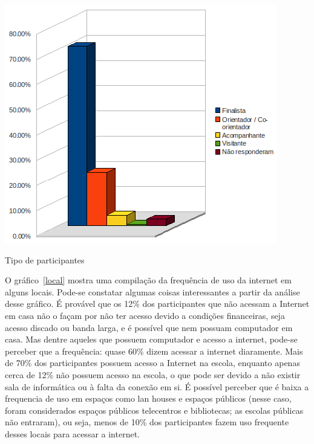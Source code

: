   \begin{grafico}
      \begin{center}
	\includegraphics[width=0.7\linewidth]{arquivos/participante.png}
      \end{center}
      \caption{Tipo de participantes}
      \label{participante}
  \end{grafico}

  O gráfico~\ref{local} mostra uma compilação da frequência de uso da internet em alguns locais. Pode-se constatar algumas coisas interessantes a partir 
da análise desse gráfico. É provável que os 12\% dos participantes que não acessam a Internet em casa não o façam por não ter acesso devido a 
condições financeiras, seja acesso discado ou banda larga, e é possível que nem possuam computador em casa. Mas dentre aqueles que possuem computador 
e acesso a internet, pode-se perceber que a frequência: quase 60\% dizem acessar a internet diaramente. Mais de 70\% dos participantes possuem 
acesso a Internet na escola, enquanto apenas cerca de 12\% não possuem acesso na escola, o que pode ser devido a não existir sala de informática 
ou à falta da conexão em si. É possível perceber que é baixa a frequencia de uso em espaços como lan houses e espaços públicos (nesse caso, foram 
considerados espaços públicos telecentros e bibliotecas; as escolas públicas não entraram), ou seja, menos de 10\% dos participantes fazem uso frequente 
desses locais para acessar a internet. 


